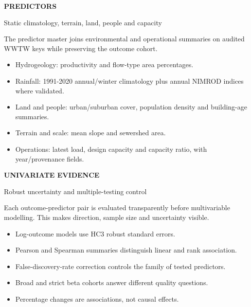 \documentclass[10pt]{article}
\begin{document}
\vfill{}
\clearpage
{\color{teal}\small\bfseries PREDICTORS}\par
{}\par
\small Static climatology, terrain, land, people and capacity\par\vspace{5mm}
The predictor master joins environmental and operational summaries on audited WWTW keys while preserving the outcome cohort.
\begin{itemize}[leftmargin=5mm]
\item Hydrogeology: productivity and flow-type area percentages.
\item Rainfall: 1991-2020 annual/winter climatology plus annual NIMROD indices where validated.
\item Land and people: urban/suburban cover, population density and building-age summaries.
\item Terrain and scale: mean slope and sewershed area.
\item Operations: latest load, design capacity and capacity ratio, with year/provenance fields.
\end{itemize}
\vfill{}
\clearpage
{\color{teal}\small\bfseries UNIVARIATE EVIDENCE}\par
{}\par
\small Robust uncertainty and multiple-testing control\par\vspace{5mm}
Each outcome-predictor pair is evaluated transparently before multivariable modelling. This makes direction, sample size and uncertainty visible.
\begin{itemize}[leftmargin=5mm]
\item Log-outcome models use HC3 robust standard errors.
\item Pearson and Spearman summaries distinguish linear and rank association.
\item False-discovery-rate correction controls the family of tested predictors.
\item Broad and strict beta cohorts answer different quality questions.
\item Percentage changes are associations, not causal effects.
\end{itemize}
\end{document}
